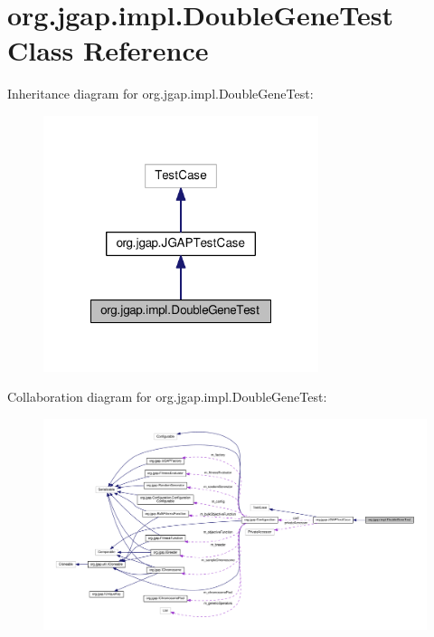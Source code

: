 \hypertarget{classorg_1_1jgap_1_1impl_1_1_double_gene_test}{\section{org.\-jgap.\-impl.\-Double\-Gene\-Test Class Reference}
\label{classorg_1_1jgap_1_1impl_1_1_double_gene_test}
}


Inheritance diagram for org.\-jgap.\-impl.\-Double\-Gene\-Test\-:
\nopagebreak
\begin{figure}[H]
\begin{center}
\leavevmode
\includegraphics[width=228pt]{classorg_1_1jgap_1_1impl_1_1_double_gene_test__inherit__graph}
\end{center}
\end{figure}


Collaboration diagram for org.\-jgap.\-impl.\-Double\-Gene\-Test\-:
\nopagebreak
\begin{figure}[H]
\begin{center}
\leavevmode
\includegraphics[width=350pt]{classorg_1_1jgap_1_1impl_1_1_double_gene_test__coll__graph}
\end{center}
\end{figure}
